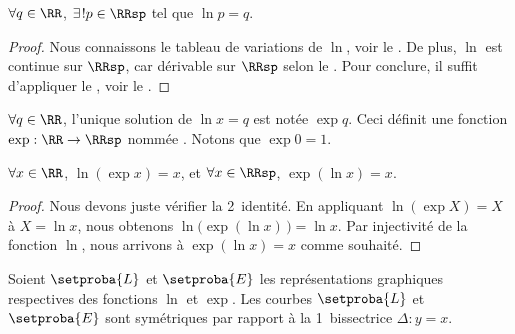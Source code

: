 \begin{fact}
	$\forall q \in \RR$,
	$\exists\kern1pt! p \in \RRsp$ tel que 
	$\ln p = q$.
\end{fact}


\begin{proof}
	Nous connaissons le tableau de variations de $\ln$, voir le .
	De plus, 
	$\ln$ est continue sur $\RRsp$, car dérivable sur $\RRsp$ selon le .
	Pour conclure,
	il suffit d'appliquer le \tvi, voir le .
\end{proof}




\begin{defi}
	$\forall q \in \RR$, 
	l'unique solution de $\ln x = q$ est notée $\exp q$.
	Ceci définit une fonction $\exp: \RR \to \RRsp$ nommée .
	Notons que $\exp 0 = 1$.
\end{defi}




\begin{fact}
	$\forall x \in \RR$, $\ln ( \exp x ) = x$,
	et
	$\forall x \in \RRsp$, $\exp ( \ln x ) = x$.
\end{fact}


\begin{proof}	
	Nous devons juste vérifier la 2\ieme\ identité.
	En appliquant $\ln ( \exp X ) = X$ à $X = \ln x$,
	nous obtenons $\ln \big( \exp ( \ln x ) \,\big) = \ln x$.
	Par injectivité de la fonction $\ln$, nous arrivons à $\exp ( \ln x ) = x$ comme souhaité.
\end{proof}




\begin{fact} \label{exp-sym-ln}
	Soient $\setproba{L}$ et $\setproba{E}$ les représentations graphiques respectives des fonctions $\ln$ et $\exp$.
	Les courbes $\setproba{L}$ et $\setproba{E}$ sont symétriques par rapport à la 1\iere\ bissectrice $\Delta: y = x$.
\end{fact}



